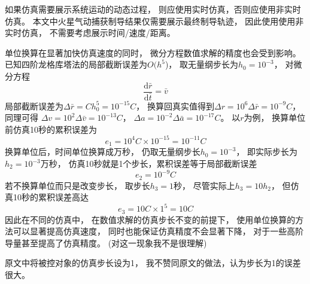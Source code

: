 如果仿真需要展示系统运动的动态过程，
则应使用实时仿真，否则应使用非实时仿真。
本文中火星气动捕获制导结果仅需要展示最终制导轨迹，
因此使用使用非实时仿真，
不需要考虑展示时间/速度/距离。

单位换算在显著加快仿真速度的同时，
微分方程数值求解的精度也会受到影响。
已知四阶龙格库塔法的局部截断误差为$O(h^5$)\cite{mqingyang2019}，
取无量纲步长为$h_0=10^{-3}$，
对微分方程
\[\frac{\text{d}\bar{r}}{\text{d}\bar{t}}=\bar{v}\]
局部截断误差为$\Delta\bar{r}=Ch_0^5=10^{-15}C$，
换算回真实值得到$\Delta r=10^6\Delta\bar{r}=10^{-9}C$，
同理可得
$\Delta v=10^2\Delta\bar{v}=10^{-13}C$，
$\Delta a=10^{-2}\Delta\bar{a}=10^{-17}C$。
以$r$为例，
换算单位前仿真10秒的累积误差为
\[e_1=10^4C\times 10^{-15}=10^{-11}C\]
换算单位后，时间单位换算成万秒，
仍取无量纲步长$h_0=10^{-3}$，
即实际步长为$h_2=10^{-3}$万秒，
仿真10秒就是1个步长，累积误差等于局部截断误差
\[e_2=10^{-9}C\]
若不换算单位而只是改变步长，
取步长$h_3=1$秒，
尽管实际上$h_3=10h_2$，
但仿真10秒的累积误差高达
\[e_3=10C\times 1^5=10C\]
因此在不同的仿真中，
在数值求解的仿真步长不变的前提下，
使用单位换算的方法可以显著提高仿真速度，
同时也能保证仿真精度不会显著下降，
对于一些高阶导量甚至提高了仿真精度。
(对这一现象我不是很理解)

原文\cite{dqingyuan2019}中将被控对象的仿真步长设为1，
我不赞同原文的做法，认为步长为1的误差很大。
